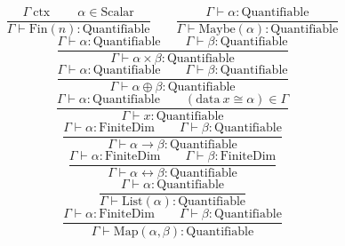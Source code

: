 \documentclass[11pt]{article}
\begin{document}
\begin{equation}
	\label{eq:quantifiable-first}
	\frac{\Gamma\ \text{ctx}\
	 \qquad \alpha \in \text{Scalar}}
	{\Gamma \vdash \text{Fin}(n) : \text{Quantifiable}}
	\qquad
	\frac{\Gamma \vdash \alpha : \text{Quantifiable}}
	{\Gamma \vdash \text{Maybe}(\alpha) : \text{Quantifiable}}
\end{equation}
\begin{equation}
	\frac{\Gamma \vdash \alpha : \text{Quantifiable}
	\qquad \Gamma \vdash \beta : \text{Quantifiable}}
	{\Gamma \vdash \alpha \times \beta : \text{Quantifiable}}
\end{equation}
\begin{equation}
	\frac{\Gamma \vdash \alpha : \text{Quantifiable}
	\qquad \Gamma \vdash \beta : \text{Quantifiable}}
	{\Gamma \vdash \alpha \oplus \beta : \text{Quantifiable}}
\end{equation}
\begin{equation}
	\frac{\Gamma \vdash \alpha : \text{Quantifiable}
	\qquad (\text{data}\ x \cong \alpha) \in \Gamma}
	{\Gamma \vdash x : \text{Quantifiable}}
\end{equation}
\begin{equation}
	\frac{\Gamma \vdash \alpha : \text{FiniteDim}
	\qquad \Gamma \vdash \beta : \text{Quantifiable}}
	{\Gamma \vdash \alpha \to \beta : \text{Quantifiable}}
\end{equation}
\begin{equation}
	\frac{\Gamma \vdash \alpha : \text{FiniteDim}
	\qquad \Gamma \vdash \beta : \text{FiniteDim}}
	{\Gamma \vdash \alpha \leftrightarrow \beta : \text{Quantifiable}}
\end{equation}
\begin{equation}
	\frac{\Gamma \vdash \alpha : \text{Quantifiable}}
	{\Gamma \vdash \text{List}(\alpha) : \text{Quantifiable}}
\end{equation}
\begin{equation}
	\label{eq:quantifiable-last}
	\frac{\Gamma \vdash \alpha : \text{FiniteDim}
	\qquad \Gamma \vdash \beta : \text{Quantifiable}}
	{\Gamma \vdash \text{Map}(\alpha, \beta) : \text{Quantifiable}}
\end{equation}
\end{document}
